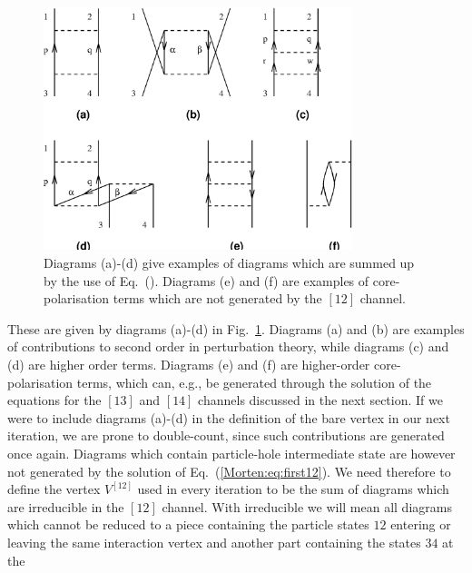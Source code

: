 \begin{figure}[tbh]
	\begin{center}
      	\includegraphics[width=9cm]{channel12.eps}
	\end{center}
      \caption{Diagrams (a)-(d) give examples of 
               diagrams which are summed up by  
               the use of Eq.~(\protect{\ref{Morten:eq:schematic12}}).
               Diagrams (e) and (f) are examples of core-polarisation
               terms which are not generated by the $[12]$ channel.}
      \label{Morten:fig:gamma12}
\end{figure}
These are given by diagrams (a)-(d) in Fig.~\ref{Morten:fig:gamma12}.
Diagrams (a) and (b) are examples of contributions to second order in
perturbation theory, while diagrams (c) and (d) are higher order
terms. Diagrams (e) and (f) are higher-order core-polarisation terms,
which can, e.g., be generated through the solution of the equations for
the $[13]$ and $[14]$ channels discussed in the next section.  If we
were to include diagrams (a)-(d) in the definition of the bare vertex
in our next iteration, we are prone to double-count, since such
contributions are generated once again. Diagrams which contain
particle-hole intermediate state are however not generated by the
solution of Eq.~(\ref{Morten:eq:first12}).  We need therefore to
define the vertex $V^{[12]}$ used in every iteration to be the sum of
diagrams which are irreducible in the $[12]$ channel.  With
irreducible we will mean all diagrams which cannot be reduced to a
piece containing the particle states $12$ entering or leaving the same
interaction vertex and another part containing the states $34$ at the

